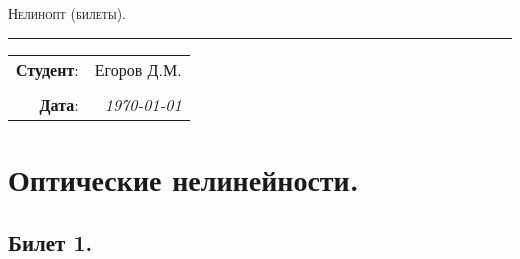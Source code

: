 \documentclass[a4paper,12pt]{article}
\theoremstyle{definition} %
\theoremstyle{definition} %
\theoremstyle{remark} %
\begin{document}
\begin{center}
	\LARGE \textsc{Нелинопт (билеты).}
\end{center}

\hrule

\phantom{42}

\begin{flushright}
	\begin{tabular}{rr}
		\textbf{Студент}: 
		& Егоров Д.М. \\
		&\\
		\textbf{Дата}: &
		\textit{\today}\\
	\end{tabular}
\end{flushright}

\thispagestyle{empty}
\tableofcontents
\newpage


\section{Оптические нелинейности.}
\subsection{Билет 1.}
\end{document}
